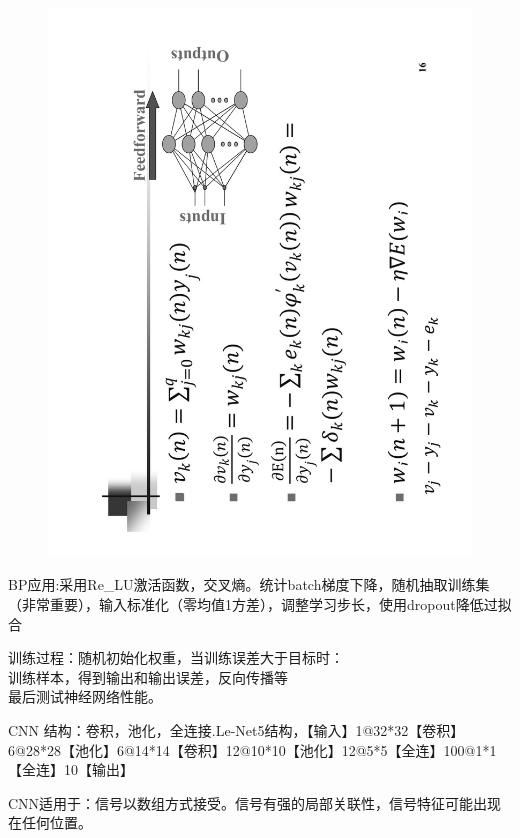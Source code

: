 \documentclass[UTF8,a4paper,landscape,16pt]{paper}
\begin{document}
\begin{multicols}{4}
\begin{figure}[H]
\includegraphics[height=\columnwidth,angle = -90]{NN/7.pdf}
\end{figure}
\noindent BP应用:采用Re\_LU激活函数，交叉熵。统计batch梯度下降，随机抽取训练集（非常重要），输入标准化（零均值1方差），调整学习步长，使用dropout降低过拟合

\noindent 训练过程：随机初始化权重，当训练误差大于目标时：\\
\noindent 训练样本，得到输出和输出误差，反向传播等\\
\noindent 最后测试神经网络性能。

\noindent CNN 结构：卷积，池化，全连接.Le-Net5结构，【输入】1@32*32【卷积】6@28*28【池化】6@14*14【卷积】12@10*10【池化】12@5*5【全连】100@1*1【全连】10【输出】

\noindent CNN适用于：信号以数组方式接受。信号有强的局部关联性，信号特征可能出现在任何位置。


\end{multicols}
\end{document}
